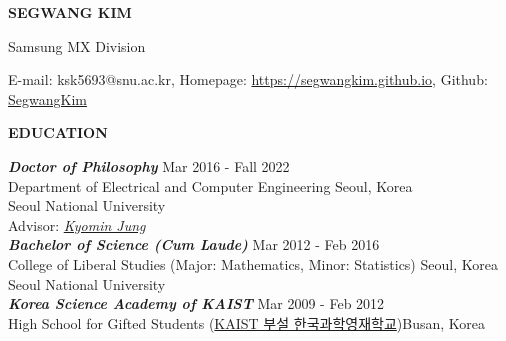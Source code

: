 \documentclass[12pt]{article}
\begin{document}

\begin{center}
	{\Large \bfseries SEGWANG KIM} \\ 
\end{center}

	\noindent Samsung MX Division\\
	\begin{small}
	E-mail: ksk5693@snu.ac.kr, Homepage: \url{https://segwangkim.github.io}, Github: \href{https://github.com/SegwangKim}{SegwangKim}
	\end{small}
\vspace{0.2in} %


\begin{center} %
	{\noindent \bfseries EDUCATION}
    \noindent\makebox[\linewidth]{\rule{0.75\paperwidth}{0.4pt}}
\end{center} %

\vspace{8pt} %

\noindent
{\sl \bfseries Doctor of Philosophy} \hfill Mar 2016 - Fall 2022\\ 
\noindent Department of Electrical and Computer Engineering \hfill Seoul, Korea\\ 
\noindent Seoul National University \\
\noindent Advisor: \href{http://milab.snu.ac.kr/kjung/}{\textit{Kyomin Jung}} \\ 

\noindent
{\sl \bfseries Bachelor of Science (Cum Laude)} \hfill Mar 2012 - Feb 2016 \\ 
\noindent College of Liberal Studies (Major: Mathematics, Minor: Statistics) \hfill Seoul, Korea\\
\noindent Seoul National University \\
	
\noindent
{\sl \bfseries Korea Science Academy of KAIST} \hfill Mar 2009 - Feb 2012 \\ 
\noindent High School for Gifted Students (\href{https://www.ksa.hs.kr/Eng}{KAIST 부설 한국과학영재학교})\hfill Busan, Korea\\
 
\vspace{0.2in} %
\end{document}
